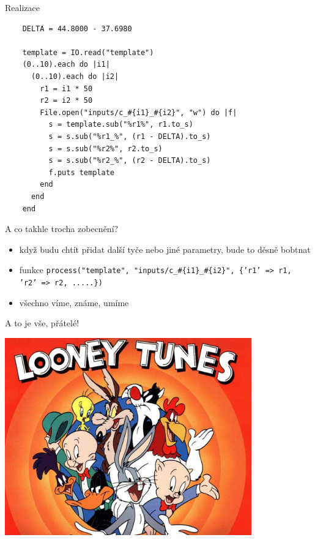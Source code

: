 \documentclass{beamer}
\begin{document}
\begin{frame}[fragile]{Realizace}
  \scriptsize
  \begin{verbatim}
    DELTA = 44.8000 - 37.6980

    template = IO.read("template")
    (0..10).each do |i1|
      (0..10).each do |i2|
        r1 = i1 * 50
        r2 = i2 * 50
        File.open("inputs/c_#{i1}_#{i2}", "w") do |f|
          s = template.sub("%r1%", r1.to_s)
          s = s.sub("%r1_%", (r1 - DELTA).to_s)
          s = s.sub("%r2%", r2.to_s)
          s = s.sub("%r2_%", (r2 - DELTA).to_s)
          f.puts template
        end
      end
    end
  \end{verbatim}
\end{frame}

\begin{frame}{A co takhle trocha zobecnění?}
  \begin{itemize}
    \item když budu chtít přidat další tyče nebo jiné parametry, bude to děsně bobtnat
    \item funkce \texttt{process("template", "inputs/c\_\#\{i1\}\_\#\{i2\}", \{'r1' => r1, 'r2' => r2, .....\})}
    \item všechno víme, známe, umíme
  \end{itemize}
\end{frame}

\begin{frame}{A to je vše, přátelé!}
  \begin{center}
    \includegraphics[width=0.8\textwidth]{looney_tunes}
  \end{center}
\end{frame}
\end{document}
